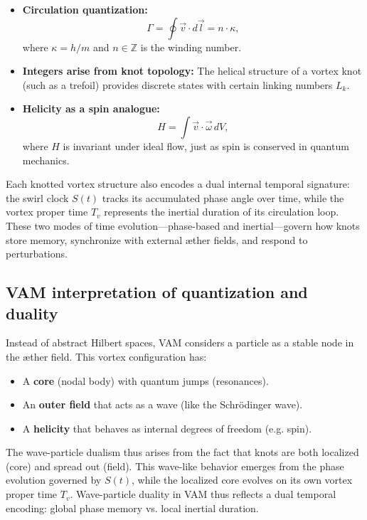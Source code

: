 \documentclass[preprint]{revtex4-2}
\begin{document}
\begin{itemize}
    \item \textbf{Circulation quantization:}
    \begin{equation}
        \Gamma = \oint \vec{v} \cdot d\vec{l} = n \cdot \kappa,
    \end{equation}
    where $\kappa = h/m$ and $n \in \mathbb{Z}$ is the winding number.
    \item \textbf{Integers arise from knot topology:} The helical structure of a vortex knot (such as a trefoil) provides discrete states with certain linking numbers $L_k$.
    \item \textbf{Helicity as a spin analogue:}
    \begin{equation}
        H = \int \vec{v} \cdot \vec{\omega} \, dV,
    \end{equation}
    where $H$ is invariant under ideal flow, just as spin is conserved in quantum mechanics.
\end{itemize}
\noindent
Each knotted vortex structure also encodes a dual internal temporal signature: the swirl clock $S(t)$ tracks its accumulated phase angle over time, while the vortex proper time $T_v$ represents the inertial duration of its circulation loop. These two modes of time evolution—phase-based and inertial—govern how knots store memory, synchronize with external æther fields, and respond to perturbations.

\subsection{VAM interpretation of quantization and duality}

Instead of abstract Hilbert spaces, VAM considers a particle as a stable node in the æther field. This vortex configuration has:

\begin{itemize}
    \item A \textbf{core} (nodal body) with quantum jumps (resonances).
    \item An \textbf{outer field} that acts as a wave (like the Schrödinger wave).
    \item A \textbf{helicity} that behaves as internal degrees of freedom (e.g. spin).
\end{itemize}
The wave-particle dualism thus arises from the fact that knots are both localized (core) and spread out (field).
This wave-like behavior emerges from the phase evolution governed by $S(t)$, while the localized core evolves on its own vortex proper time $T_v$. Wave-particle duality in VAM thus reflects a dual temporal encoding: global phase memory vs. local inertial duration.
\end{document}
